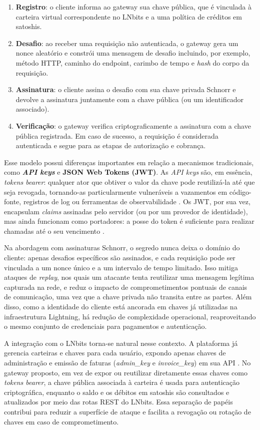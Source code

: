 \documentclass[openright]{normas-utf-tex}
\begin{document}
\begin{enumerate}
    \item \textbf{Registro}: o cliente informa ao gateway sua chave pública, que é vinculada à carteira virtual correspondente no LNbits e a uma política de créditos em satoshis.
    \item \textbf{Desafio}: ao receber uma requisição não autenticada, o gateway gera um nonce aleatório e constrói uma mensagem de desafio incluindo, por exemplo, método HTTP, caminho do endpoint, carimbo de tempo e \textit{hash} do corpo da requisição.
    \item \textbf{Assinatura}: o cliente assina o desafio com sua chave privada Schnorr e devolve a assinatura juntamente com a chave pública (ou um identificador associado).
    \item \textbf{Verificação}: o gateway verifica criptograficamente a assinatura com a chave pública registrada. Em caso de sucesso, a requisição é considerada autenticada e segue para as etapas de autorização e cobrança.
\end{enumerate}

Esse modelo possui diferenças importantes em relação a mecanismos tradicionais, como \textbf{\textit{API keys}} e \textbf{JSON Web Tokens (JWT)}. As \textit{API keys} são, em essência, \textit{tokens bearer}: qualquer ator que obtiver o valor da chave pode reutilizá-la até que seja revogada, tornando-as particularmente vulneráveis a vazamentos em código-fonte, registros de log ou ferramentas de observabilidade \cite{owasp2021api}. Os JWT, por sua vez, encapsulam \textit{claims} assinadas pelo servidor (ou por um provedor de identidade), mas ainda funcionam como portadores: a posse do token é suficiente para realizar chamadas até o seu vencimento \cite{jones2015jwt}.

Na abordagem com assinaturas Schnorr, o segredo nunca deixa o domínio do cliente: apenas desafios específicos são assinados, e cada requisição pode ser vinculada a um nonce único e a um intervalo de tempo limitado. Isso mitiga ataques de \textit{replay}, nos quais um atacante tenta reutilizar uma mensagem legítima capturada na rede, e reduz o impacto de comprometimentos pontuais de canais de comunicação, uma vez que a chave privada não transita entre as partes. Além disso, como a identidade do cliente está ancorada em chaves já utilizadas na infraestrutura Lightning, há redução de complexidade operacional, reaproveitando o mesmo conjunto de credenciais para pagamentos e autenticação.

A integração com o LNbits torna-se natural nesse contexto. A plataforma já gerencia carteiras e chaves para cada usuário, expondo apenas chaves de administração e emissão de faturas (\textit{admin\_key} e \textit{invoice\_key}) em sua API \cite{lnbitsdocs}. No gateway proposto, em vez de expor ou reutilizar diretamente essas chaves como \textit{tokens bearer}, a chave pública associada à carteira é usada para autenticação criptográfica, enquanto o saldo e os débitos em satoshis são consultados e atualizados por meio das rotas REST do LNbits. Essa separação de papéis contribui para reduzir a superfície de ataque e facilita a revogação ou rotação de chaves em caso de comprometimento.
\end{document}
